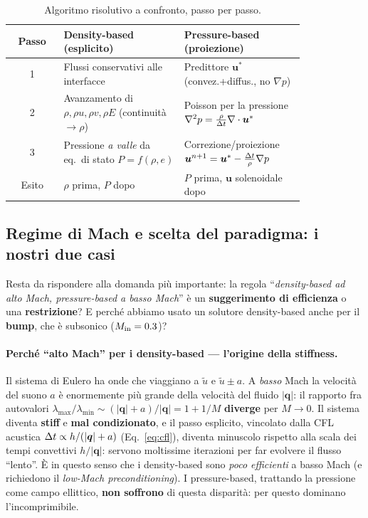 \begin{table}[H]
\centering
\caption{Algoritmo risolutivo a confronto, passo per passo.}
\label{tab:paradigmi_algoritmo}
\renewcommand{\arraystretch}{1.3}
\begin{tabular}{c p{0.41\linewidth} p{0.41\linewidth}}
\toprule
\textbf{Passo} & \textbf{Density-based (esplicito)} & \textbf{Pressure-based (proiezione)} \\
\midrule
1 & Flussi conservativi alle interfacce & Predittore $\bm u^{*}$ (convez.+diffus., no $\nabla p$) \\
2 & Avanzamento di $\rho,\rho u,\rho v,\rho E$ (continuità $\to\rho$) & Poisson per la pressione $\nabla^2p=\tfrac{\rho}{\Delta t}\nabla\cdot\bm u^{*}$ \\
3 & Pressione \emph{a valle} da eq.\ di stato $P=f(\rho,e)$ & Correzione/proiezione $\bm u^{n+1}=\bm u^{*}-\tfrac{\Delta t}{\rho}\nabla p$ \\
\midrule
Esito & $\rho$ prima, $P$ dopo & $P$ prima, $\bm u$ solenoidale dopo \\
\bottomrule
\end{tabular}
\end{table}

\subsection{Regime di Mach e scelta del paradigma: i nostri due casi}
\label{sub:mach_paradigma}

Resta da rispondere alla domanda più importante: la regola ``\emph{density-based ad alto
Mach, pressure-based a basso Mach}'' è un \textbf{suggerimento di efficienza} o una
\textbf{restrizione}? E perché abbiamo usato un solutore density-based anche per il
\textbf{bump}, che è subsonico ($M_{\rm in}=0.3$)?

\paragraph{Perché ``alto Mach'' per i density-based --- l'origine della stiffness.}
Il sistema di Eulero ha onde che viaggiano a $\tilde u$ e $\tilde u\pm a$. A \emph{basso}
Mach la velocità del suono $a$ è enormemente più grande della velocità del fluido
$|\bm q|$: il rapporto fra autovalori
$\lambda_{\max}/\lambda_{\min}\sim(|\bm q|+a)/|\bm q|=1+1/M$ \textbf{diverge} per
$M\to0$. Il sistema diventa \textbf{stiff} e \textbf{mal condizionato}, e il passo
esplicito, vincolato dalla CFL acustica $\Delta t\propto h/(|\bm q|+a)$
(Eq.~\eqref{eq:cfl}), diventa minuscolo rispetto alla scala dei tempi convettivi
$h/|\bm q|$: servono moltissime iterazioni per far evolvere il flusso ``lento''. È in
questo senso che i density-based sono \emph{poco efficienti} a basso Mach (e richiedono il
\emph{low-Mach preconditioning}). I pressure-based, trattando la pressione come campo
ellittico, \textbf{non soffrono} di questa disparità: per questo dominano l'incomprimibile.

